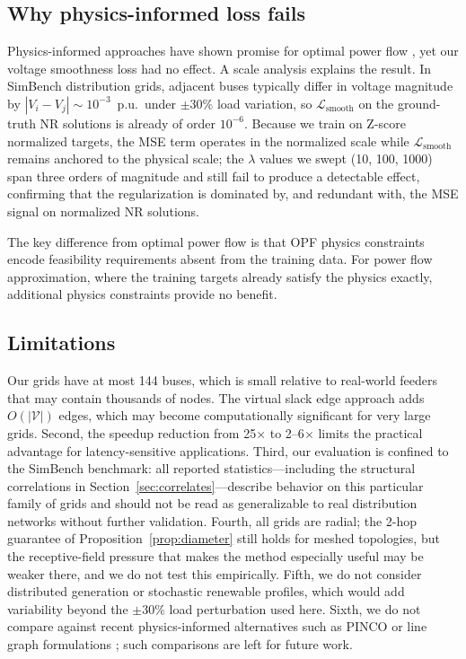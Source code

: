 \documentclass[preprint,review,12pt]{elsarticle}
\begin{document}
\subsection{Why physics-informed loss fails}

Physics-informed approaches have shown promise for optimal power flow \cite{b7,b8}, yet our voltage smoothness loss had no effect. A scale analysis explains the result. In SimBench distribution grids, adjacent buses typically differ in voltage magnitude by $|V_i - V_j| \sim 10^{-3}$~p.u.\ under $\pm30\%$ load variation, so $\mathcal{L}_{\text{smooth}}$ on the ground-truth NR solutions is already of order $10^{-6}$. Because we train on Z-score normalized targets, the MSE term operates in the normalized scale while $\mathcal{L}_{\text{smooth}}$ remains anchored to the physical scale; the $\lambda$ values we swept (10, 100, 1000) span three orders of magnitude and still fail to produce a detectable effect, confirming that the regularization is dominated by, and redundant with, the MSE signal on normalized NR solutions.

The key difference from optimal power flow \cite{b7} is that OPF physics constraints encode feasibility requirements absent from the training data. For power flow approximation, where the training targets already satisfy the physics exactly, additional physics constraints provide no benefit.

\subsection{Limitations}

Our grids have at most 144 buses, which is small relative to real-world feeders that may contain thousands of nodes. The virtual slack edge approach adds $O(|\mathcal{V}|)$ edges, which may become computationally significant for very large grids. Second, the speedup reduction from 25$\times$ to 2--6$\times$ limits the practical advantage for latency-sensitive applications. Third, our evaluation is confined to the SimBench benchmark: all reported statistics---including the structural correlations in Section~\ref{sec:correlates}---describe behavior on this particular family of grids and should not be read as generalizable to real distribution networks without further validation. Fourth, all grids are radial; the 2-hop guarantee of Proposition~\ref{prop:diameter} still holds for meshed topologies, but the receptive-field pressure that makes the method especially useful may be weaker there, and we do not test this empirically. Fifth, we do not consider distributed generation or stochastic renewable profiles, which would add variability beyond the $\pm 30\%$ load perturbation used here. Sixth, we do not compare against recent physics-informed alternatives such as PINCO \cite{b7} or line graph formulations \cite{b8}; such comparisons are left for future work.
\end{document}
